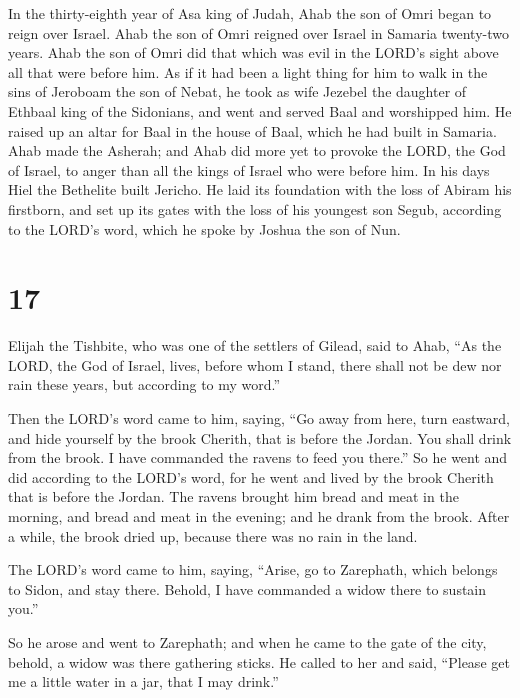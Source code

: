  In the thirty-eighth year of Asa king of Judah, Ahab the
son of Omri began to reign over Israel. Ahab the son of Omri reigned
over Israel in Samaria twenty-two years.  Ahab the son of
Omri did that which was evil in the LORD's sight above all that were
before him.  As if it had been a light thing for him to
walk in the sins of Jeroboam the son of Nebat, he took as wife Jezebel
the daughter of Ethbaal king of the Sidonians, and went and served Baal
and worshipped him.  He raised up an altar for Baal in the
house of Baal, which he had built in Samaria.  Ahab made
the Asherah; and Ahab did more yet to provoke the LORD, the God of
Israel, to anger than all the kings of Israel who were before him.
 In his days Hiel the Bethelite built Jericho. He laid its
foundation with the loss of Abiram his firstborn, and set up its gates
with the loss of his youngest son Segub, according to the LORD's word,
which he spoke by Joshua the son of Nun.

\hypertarget{section-16}{%
\section{17}\label{section-16}}

 Elijah the Tishbite, who was one of the settlers of Gilead,
said to Ahab, ``As the LORD, the God of Israel, lives, before whom I
stand, there shall not be dew nor rain these years, but according to my
word.''

 Then the LORD's word came to him, saying,  ``Go
away from here, turn eastward, and hide yourself by the brook Cherith,
that is before the Jordan.  You shall drink from the brook.
I have commanded the ravens to feed you there.''  So he went
and did according to the LORD's word, for he went and lived by the brook
Cherith that is before the Jordan.  The ravens brought him
bread and meat in the morning, and bread and meat in the evening; and he
drank from the brook.  After a while, the brook dried up,
because there was no rain in the land.

 The LORD's word came to him, saying,  ``Arise,
go to Zarephath, which belongs to Sidon, and stay there. Behold, I have
commanded a widow there to sustain you.''

 So he arose and went to Zarephath; and when he came to the
gate of the city, behold, a widow was there gathering sticks. He called
to her and said, ``Please get me a little water in a jar, that I may
drink.''

